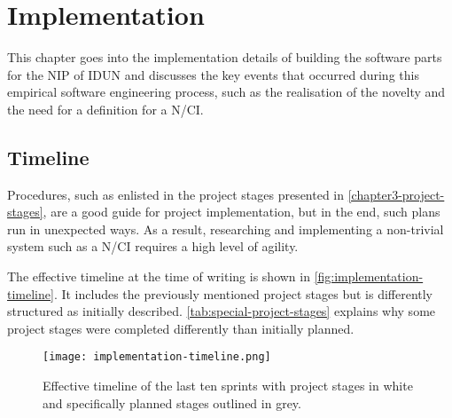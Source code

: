 \chapter{Implementation}
\graphicspath{{Chapter4/Figs/}{Chapter4/Figs/}}

This chapter goes into the implementation details of building the software parts for the NIP of IDUN and discusses the key events that occurred during this empirical software engineering process, such as the realisation of the novelty and the need for a definition for a N/CI.

\section{Timeline}
\label{chapter4-timeline}

Procedures, such as enlisted in the project stages presented in \autoref{chapter3-project-stages}, are a good guide for project implementation, but in the end, such plans run in unexpected ways. As a result, researching and implementing a non-trivial system such as a N/CI requires a high level of agility.

The effective timeline at the time of writing is shown in \autoref{fig:implementation-timeline}. It includes the previously mentioned project stages but is differently structured as initially described. \autoref{tab:special-project-stages} explains why some project stages were completed differently than initially planned.

\begin{figure}[!ht]
  \centering
  \texttt{[image: implementation-timeline.png]}
  \caption{Effective timeline of the last ten sprints with project stages in white and specifically planned stages outlined in grey.}
  \label{fig:implementation-timeline}
\end{figure}

